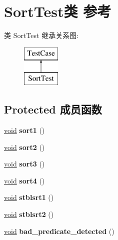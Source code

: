 \hypertarget{class_sort_test}{}\section{Sort\+Test类 参考}
\label{class_sort_test}
类 Sort\+Test 继承关系图\+:\begin{figure}[H]
\begin{center}
\leavevmode
\includegraphics[height=2.000000cm]{class_sort_test}
\end{center}
\end{figure}
\subsection*{Protected 成员函数}
\begin{DoxyCompactItemize}
\item 
\mbox{\label{class_sort_test_a750bc8664cd0d6e17b5a30b40a6d39e1}} 
\hyperlink{interfacevoid}{void} {\bfseries sort1} ()
\item 
\mbox{\label{class_sort_test_a00109a088526cb6505b10d066f900cf0}} 
\hyperlink{interfacevoid}{void} {\bfseries sort2} ()
\item 
\mbox{\label{class_sort_test_a56ba27678856b1cd122b97fe4529a04a}} 
\hyperlink{interfacevoid}{void} {\bfseries sort3} ()
\item 
\mbox{\label{class_sort_test_adc6fce3f46cea1c089c30df17bda43a3}} 
\hyperlink{interfacevoid}{void} {\bfseries sort4} ()
\item 
\mbox{\label{class_sort_test_ab3736239458f9cd1f3b7b815f4f142da}} 
\hyperlink{interfacevoid}{void} {\bfseries stblsrt1} ()
\item 
\mbox{\label{class_sort_test_a6af35246382418bfb1b4c0f2c3d593bf}} 
\hyperlink{interfacevoid}{void} {\bfseries stblsrt2} ()
\item 
\mbox{\label{class_sort_test_a4e7591b20682bcb9e9590c859606add4}} 
\hyperlink{interfacevoid}{void} {\bfseries bad\+\_\+predicate\+\_\+detected} ()
\end{DoxyCompactItemize}
